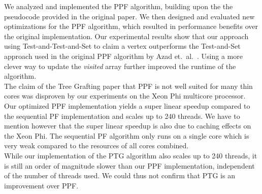\documentclass[letterpaper]{article}
\begin{document}
We analyzed and implemented the PPF algorithm, building upon the the pseudocode provided in the original paper. We then designed and evaluated new optimizations for the PPF algorithm, which resulted in performance benefits over the original implementation. Our experimental results show that our approach using Test-and-Test-and-Set to claim a vertex outperforms the  Test-and-Set approach used in the original PPF algorithm by Azad et.\ al.\ \cite{Azad:2012}. Using a more clever way to update the \textit{visited} array further improved the runtime of the algorithm.\\

The claim of the Tree Grafting paper \cite{Azad:2015} that PPF is not well suited for many thin cores was disproven by our experiments on the Xeon Phi multicore processor. Our optimized PPF implementation yields a super linear speedup compared to the sequential PF implementation and scales up to 240 threads. We have to mention however that the super linear speedup is also due to caching effects on the Xeon Phi. The sequential PF algorithm only runs on a single core which is very weak compared to the resources of all cores combined.\\

While our implementation of the PTG algorithm also scales up to 240 threads, it is still an order of magnitude slower than our PPF implementation, independent of the number of threads used. We could thus not confirm that PTG is an improvement over PPF.
\end{document}
